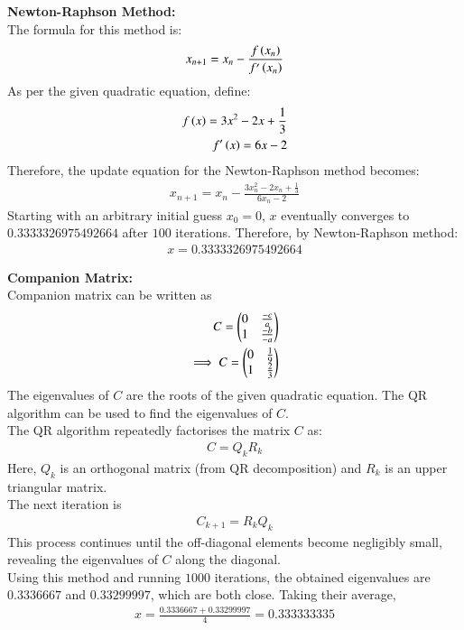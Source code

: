 \documentclass[journal]{IEEEtran}
\begin{document}
\textbf{Newton-Raphson Method:}\\
The formula for this method is:
\begin{align}
    x_{n+1} = x_n - \frac{f\left(x_n\right)}{f^\prime\left(x_n\right)}
\end{align}
As per the given quadratic equation, define:
\begin{align}
    f\left(x\right) = 3x^2 - 2x + \frac{1}{3} \\
    f^\prime\left(x\right) = 6x - 2
\end{align}
Therefore, the update equation for the Newton-Raphson method becomes:
\begin{align}
    x_{n+1} = x_n - \frac{3x_n^2 - 2x_n + \frac{1}{3}}{6x_n - 2}
\end{align}
Starting with an arbitrary initial guess $x_0 = 0$, $x$ eventually converges to $0.3333326975492664$ after $100$ iterations. Therefore, by Newton-Raphson method:
\begin{align}
    x = 0.3333326975492664
\end{align}

\textbf{Companion Matrix:}\\
Companion matrix can be written as
\begin{align}
    C = \begin{pmatrix}0 & \frac{-c}{a} \\ 1 & \frac{-b}{-a}\end{pmatrix} \\
    \implies C = \begin{pmatrix}0 & \frac{1}{9} \\ 1 & \frac{2}{3}\end{pmatrix}
\end{align}
The eigenvalues of $C$ are the roots of the given quadratic equation. The QR algorithm can be used to find the eigenvalues of $C$. \\
The QR algorithm repeatedly factorises the matrix $C$ as:
\begin{align}
    C = Q_kR_k
\end{align}
Here, $Q_k$ is an orthogonal matrix (from QR decomposition) and $R_k$ is an upper triangular matrix. \\
The next iteration is
\begin{align}
    C_{k+1} = R_kQ_k
\end{align}
This process continues until the off-diagonal elements become negligibly small, revealing the eigenvalues of $C$ along the diagonal. \\
Using this method and running $1000$ iterations, the obtained eigenvalues are $0.3336667$ and $0.33299997$, which are both close. Taking their average, 
\begin{align}
    x = \frac{0.3336667+0.33299997}{4} = 0.333333335
\end{align}
\end{document}
